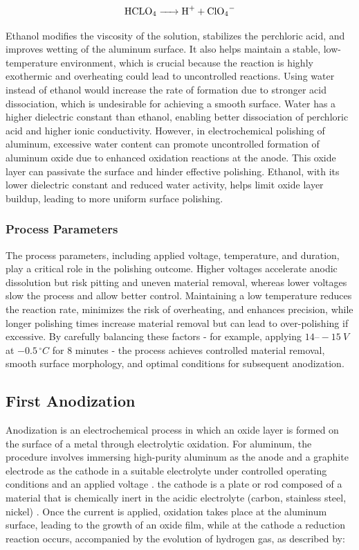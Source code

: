 \documentclass{rapportCS}
\begin{document}
	\begin{equation}
		\ce{HCLO4 -> H+ + ClO4-}
		\label{eq:acid-dissociation}
	\end{equation}
	 
	 Ethanol modifies the viscosity of the solution, stabilizes the perchloric acid, and improves wetting of the aluminum surface. It also helps maintain a stable, low-temperature environment, which is crucial because the reaction is highly exothermic and overheating could lead to uncontrolled reactions. Using water instead of ethanol would increase the rate of  formation due to stronger acid dissociation, which is undesirable for achieving a smooth surface. Water has a higher dielectric constant than ethanol, enabling better dissociation of perchloric acid and higher ionic conductivity. However, in electrochemical polishing of aluminum, excessive water content can promote uncontrolled formation of aluminum oxide due to enhanced oxidation reactions at the anode. This oxide layer can passivate the surface and hinder effective polishing. Ethanol, with its lower dielectric constant and reduced water activity, helps limit oxide layer buildup, leading to more uniform surface polishing.
	 
	
	\subsubsection{Process Parameters}
	
	The process parameters, including applied voltage, temperature, and duration, play a critical role in the polishing outcome. Higher voltages accelerate anodic dissolution but risk pitting and uneven material removal, whereas lower voltages slow the process and allow better control. Maintaining a low temperature reduces the reaction rate, minimizes the risk of overheating, and enhances precision, while longer polishing times increase material removal but can lead to over-polishing if excessive. By carefully balancing these factors - for example, applying $14–-15~V$ at $ -0.5\,^\circ C$ for $8$ minutes - the process achieves controlled material removal, smooth surface morphology, and optimal conditions for subsequent anodization.
	
	
	
	\subsection{First Anodization}
	
	Anodization is an electrochemical process in which an oxide layer is formed on the surface of a metal through electrolytic oxidation. For aluminum, the procedure involves immersing high-purity aluminum as the anode and a graphite electrode as the cathode in a suitable electrolyte under controlled operating conditions and an applied voltage \cite{lv2017research}. the
	cathode is a plate or rod composed of a material that is chemically inert
	in the acidic electrolyte (carbon, stainless steel, nickel) \cite{bibideessaa2023review}. Once the current is applied, oxidation takes place at the aluminum surface, leading to the growth of an oxide film, while at the cathode a reduction reaction occurs, accompanied by the evolution of hydrogen gas, as described by\cite{lv2017research}:
	
\end{document}
